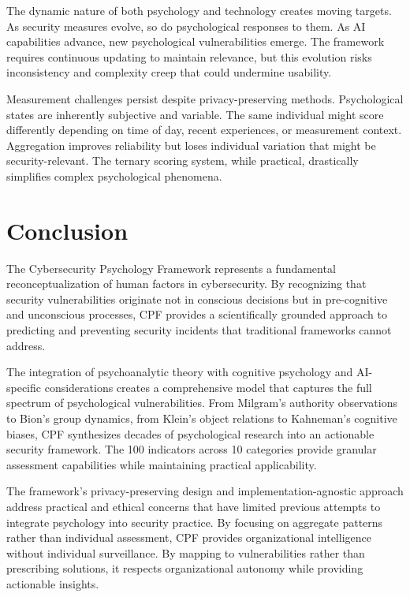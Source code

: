 \documentclass[manuscript,screen,review]{acmart}
\begin{document}
The dynamic nature of both psychology and technology creates moving targets. As security measures evolve, so do psychological responses to them. As AI capabilities advance, new psychological vulnerabilities emerge. The framework requires continuous updating to maintain relevance, but this evolution risks inconsistency and complexity creep that could undermine usability.

Measurement challenges persist despite privacy-preserving methods. Psychological states are inherently subjective and variable. The same individual might score differently depending on time of day, recent experiences, or measurement context. Aggregation improves reliability but loses individual variation that might be security-relevant. The ternary scoring system, while practical, drastically simplifies complex psychological phenomena.

\section{Conclusion}

The Cybersecurity Psychology Framework represents a fundamental reconceptualization of human factors in cybersecurity. By recognizing that security vulnerabilities originate not in conscious decisions but in pre-cognitive and unconscious processes, CPF provides a scientifically grounded approach to predicting and preventing security incidents that traditional frameworks cannot address.

The integration of psychoanalytic theory with cognitive psychology and AI-specific considerations creates a comprehensive model that captures the full spectrum of psychological vulnerabilities. From Milgram's authority observations to Bion's group dynamics, from Klein's object relations to Kahneman's cognitive biases, CPF synthesizes decades of psychological research into an actionable security framework. The 100 indicators across 10 categories provide granular assessment capabilities while maintaining practical applicability.

The framework's privacy-preserving design and implementation-agnostic approach address practical and ethical concerns that have limited previous attempts to integrate psychology into security practice. By focusing on aggregate patterns rather than individual assessment, CPF provides organizational intelligence without individual surveillance. By mapping to vulnerabilities rather than prescribing solutions, it respects organizational autonomy while providing actionable insights.
\end{document}
